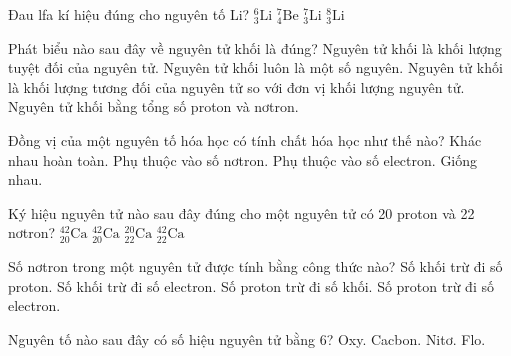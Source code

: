 \begin{ex}%
	Đau lfa kí hiệu đúng cho nguyên tố Li?
	\choice
	{$_{3}^{6} \text{Li}$}
	{$_{4}^{7} \text{Be}$}
	{\True $_{3}^{7} \text{Li}$}
	{$_{3}^{8} \text{Li}$}
\end{ex}
\begin{ex}%
	Phát biểu nào sau đây về nguyên tử khối là đúng?
	\choice
	{Nguyên tử khối là khối lượng tuyệt đối của nguyên tử.}
	{Nguyên tử khối luôn là một số nguyên.}
	{\True Nguyên tử khối là khối lượng tương đối của nguyên tử so với đơn vị khối lượng nguyên tử.}
	{Nguyên tử khối bằng tổng số proton và nơtron.}
\end{ex}
\begin{ex}%
	Đồng vị của một nguyên tố hóa học có tính chất hóa học như thế nào?
	\choice
	{Khác nhau hoàn toàn.}
	{Phụ thuộc vào số nơtron.}
	{Phụ thuộc vào số electron.}
	{\True Giống nhau.}
\end{ex}
\begin{ex}%
	Ký hiệu nguyên tử nào sau đây đúng cho một nguyên tử có 20 proton và 22 nơtron?
	\choice
	{$_{20}^{42} \text{Ca}$}
	{\True $_{20}^{42} \text{Ca}$}
	{$_{22}^{20} \text{Ca}$}
	{$_{22}^{42} \text{Ca}$}
\end{ex}
\begin{ex}%
	Số nơtron trong một nguyên tử được tính bằng công thức nào?
	\choice
	{\True Số khối trừ đi số proton.}
	{Số khối trừ đi số electron.}
	{Số proton trừ đi số khối.}
	{Số proton trừ đi số electron.}
\end{ex}
\begin{ex}%
	Nguyên tố nào sau đây có số hiệu nguyên tử bằng 6?
	\choice
	{Oxy.}
	{\True Cacbon.}
	{Nitơ.}
	{Flo.}
\end{ex}
